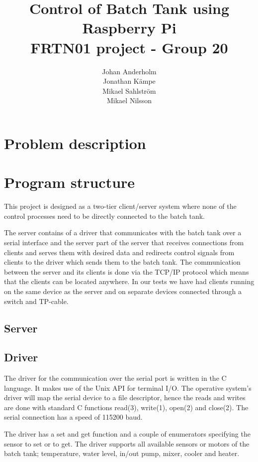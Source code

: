 \documentclass{article}
\title{Control of Batch Tank using Raspberry Pi \\ FRTN01 project - Group 20}
\date{}
\author{Johan Anderholm \\ Jonathan Kämpe \\ Mikael Sahlström \\ Mikael Nilsson}
\begin{document}
\maketitle
\newpage
\tableofcontents
\newpage
\section{Problem description}

\section{Program structure}
This project is designed as a two-tier client/server system \cite[p.~6]{clientserver} where none of the control processes need to be directly connected to the batch tank.

The server contains of a driver that communicates with the batch tank over a serial interface and the server part of the server that receives connections from clients and serves them with desired data and redirects control signals from clients to the driver which sends them to the batch tank. The communication between the server and its clients is done via the TCP/IP protocol which means that the clients can be located anywhere. In our tests we have had clients running on the same device as the server and on separate devices connected through a switch and TP-cable.

\subsection{Server}

\subsection{Driver}
The driver for the communication over the serial port is written in the C language. It makes use of the Unix API for terminal I/O. The operative system's driver will map the serial device to a file descriptor, hence the reads and writes are done with standard C functions read(3), write(1), open(2) and close(2).  The serial connection has a speed of 115200 baud. 

The driver has a set and get function and a couple of enumerators specifying the sensor to set or to get. The driver supports all available sensors or motors of the batch tank; temperature, water level, in/out pump, mixer, cooler and heater.
\end{document}
